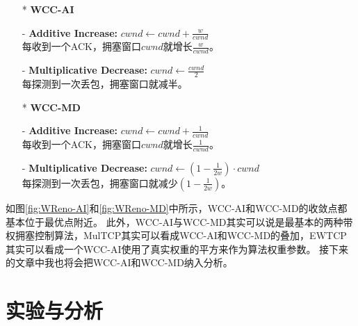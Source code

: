 \documentclass[winfonts]{njuthesis}
\begin{document}
\begin{itemize}
  \item[*] \textbf{\large WCC-AI}
  \item[-] {\bf Additive Increase:} $cwnd \leftarrow cwnd + \frac{w}{cwnd}$ \\
  每收到一个ACK，拥塞窗口$cwnd$就增长$\frac{w}{cwnd}$。
  \item[-] {\bf Multiplicative Decrease:} $cwnd \leftarrow \frac{cwnd}{2}$ \\
  每探测到一次丢包，拥塞窗口就减半。
\end{itemize}


\begin{itemize}
  \item[*] \textbf{\large WCC-MD}
  \item[-] {\bf Additive Increase:} $cwnd \leftarrow cwnd + \frac{1}{cwnd}$ \\
  每收到一个ACK，拥塞窗口$cwnd$就增长$\frac{1}{cwnd}$。
  \item[-] {\bf Multiplicative Decrease:} $cwnd \leftarrow ( 1 - \frac{1}{2w}) \cdot cwnd$ \\
  每探测到一次丢包，拥塞窗口就减少$\left( 1 - \frac{1}{2w} \right)$。
\end{itemize}

如图\ref{fig:WReno-AI}和\ref{fig:WReno-MD}中所示，WCC-AI和WCC-MD的收敛点都基本位于最优点附近。
此外，WCC-AI与WCC-MD其实可以说是最基本的两种带权拥塞控制算法，MulTCP其实可以看成WCC-AI和WCC-MD的叠加，EWTCP其实可以看成一个WCC-AI使用了真实权重的平方来作为算法权重参数。
接下来的文章中我也将会把WCC-AI和WCC-MD纳入分析。

\chapter{实验与分析}\label{chapter:analysis}

\end{document}

